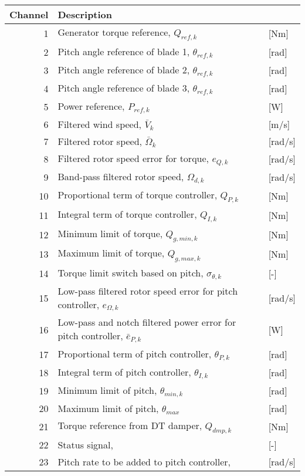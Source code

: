 \begin{table}[t]
\center
\begin{tabular}{r|ll}
Channel & Description \\ \hline
 1& Generator torque reference, $Q_{ref,k}$            &[Nm]\\
 2& Pitch angle reference of blade 1, $\theta_{ref,k}$      &[rad]\\
 3& Pitch angle reference of blade 2, $\theta_{ref,k}$      &[rad]\\
 4& Pitch angle reference of blade 3, $\theta_{ref,k}$      &[rad]\\
 5& Power reference, $P_{ref,k}$                       &[W]\\
 6& Filtered wind speed, $\bar V_k$                   &[m/s]\\
 7& Filtered rotor speed, $\bar \Omega_k$                  &[rad/s]\\
 8& Filtered rotor speed error for torque, $e_{Q,k}$ &[rad/s]\\
 9& Band-pass filtered rotor speed, $\Omega_{d,k}$         &[rad/s]\\
10& Proportional term of torque controller, $Q_{P,k}$    &[Nm]\\
11& Integral term of torque controller, $Q_{I,k}$    &[Nm]\\
12& Minimum limit of torque, $Q_{g,min,k}$               &[Nm]\\
13& Maximum limit of torque, $Q_{g,max,k}$               &[Nm]\\
14& Torque limit switch based on pitch, $\sigma_{\theta,k}$    &[-]\\
15& Low-pass filtered rotor speed error for pitch controller, $e_{\Omega,k}$  &[rad/s]\\
16& Low-pass and notch filtered power error for pitch controller, $\bar e_{P,k}$                 &[W]\\
17& Proportional term of pitch controller, $\theta_{P,k}$ &[rad]\\
18& Integral term of pitch controller, $\theta_{I,k}$     &[rad]\\
19& Minimum limit of pitch, $\theta_{min,k}$                &[rad]\\
20& Maximum limit of pitch, $\theta_{max}$                &[rad]\\
21& Torque reference from DT damper, $Q_{dmp,k}$       &[Nm] \\
22& Status signal,        &[-] \\
23& Pitch rate to be added to pitch controller,        &[rad/s]\\

\end{tabular}
\end{table}
